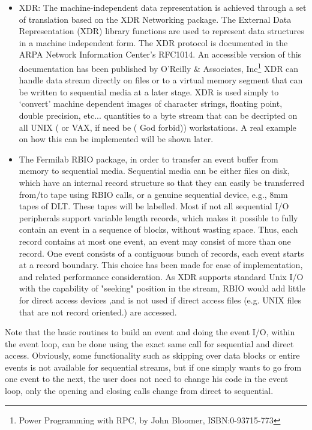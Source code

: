 \begin{itemize}
\item	XDR: The machine-independent data representation is  achieved through a
set of translation based on the XDR Networking package. The External Data
Representation (XDR) library functions are used to represent data structures
in a machine independent form. The XDR protocol is documented in the
ARPA Network Information Center's RFC1014. An accessible version of this
documentation has been published by O'Reilly \& Associates, Inc\footnote{Power
Programming with RPC, by John Bloomer, ISBN:0-93715-773}
   XDR can handle data
stream directly on files or to a virtual memory  segment that can be written to
sequential media at a later stage. XDR is used simply to `convert' machine
dependent images of character strings, floating  point, double precision,
etc... quantities to a byte stream that can be decripted on all UNIX ( or VAX,
if need be ( God forbid)) workstations.  A real example on how this can be
implemented will be shown later.
\item  The Fermilab RBIO package, in order to transfer an event  buffer from
memory to sequential media. Sequential media can be either files on disk,
which have an internal record structure so that they can easily be transferred
from/to tape using RBIO calls, or a genuine sequential device, e.g.,
8mm tapes of DLT.  These tapes will be labelled.  Most if not all
sequential I/O peripherals support variable length records,  which
makes it possible to fully contain an event in a sequence of blocks,  without
wasting space. Thus, each record contains at most one event, an  event may
consist of more than one record. One event consists of a contiguous bunch of
records, each event starts at a record boundary. This choice has been made for
ease of implementation, and related performance consideration.  As XDR supports
standard Unix I/O  with the capability of "seeking" position in the stream,
RBIO would add little  for direct access devices ,and is not used if direct
access files (e.g. UNIX files that are not record oriented.) are accessed.
\end{itemize}

	Note that the basic routines to build an event and doing the
event I/O, within the event loop, can be done using the exact same call
for sequential and direct access.  Obviously, some functionality such as
skipping over data blocks or entire events is not available for sequential
streams, but if one simply wants to go from one event to the next,
the user does not need to change his code in the event loop, only the opening
and closing calls change from direct to sequential.

